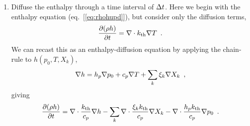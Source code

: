 \begin{description}
\begin{enumerate}
\item Diffuse the enthalpy through a time interval of $\Delta t$.  Here we begin
with the enthalpy equation (eq.~[\ref{eq:rhohupd}]), but consider only the 
diffusion terms,
\begin{equation}
  \frac{\partial (\rho h)}{\partial t}  = 
 \nabla\cdot k_{\rm th}\nabla T 
\enskip . \label{eq:rhohupdthermal} 
  \end{equation}
We can recast this as an enthalpy-diffusion equation by applying the
chain-rule to $h(p_0,T,X_k)$,
\begin{equation}
\nabla h = h_p \nabla p_0 + c_p \nabla T + \sum_k \xi_k \nabla X_k \enskip ,
\end{equation}
giving
\begin{equation}
  \frac{\partial (\rho h)}{\partial t}  = 
 \nabla\cdot \frac{k_{\rm th}}{c_p}\nabla h -  
 \sum_k \nabla\cdot \frac{\xi_k k_{\rm th}}{c_p}\nabla X_k -
 \nabla\cdot \frac{h_p k_{\rm th}}{c_p}\nabla p_0 
\enskip . \label{eq:rhohupdthermal2} 
  \end{equation}



\end{enumerate}
\end{description}
